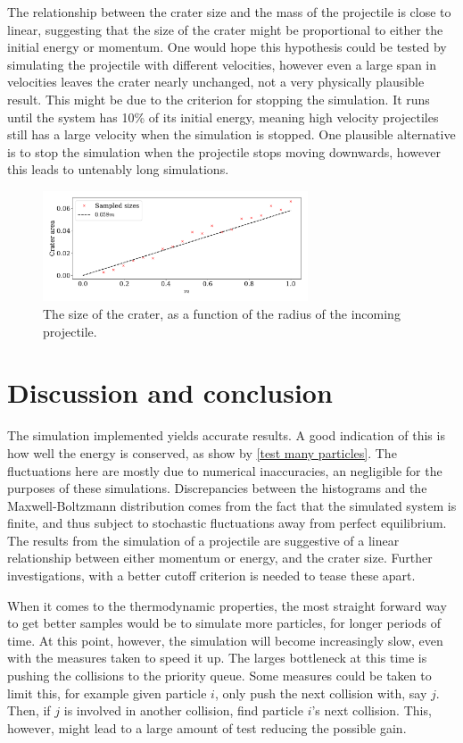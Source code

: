 \documentclass{article}
\begin{document}
    The relationship between the crater size and the mass of the projectile is close to linear, suggesting that the size of the crater might be proportional to either the initial energy or momentum.
    One would hope this hypothesis could be tested by simulating the projectile with different velocities, however even a large span in velocities leaves the crater nearly unchanged, not a very physically plausible result. 
    This might be due to the criterion for stopping the simulation.
    It runs until the system has 10\% of its initial energy, meaning high velocity projectiles still has a large velocity when the simulation is stopped. 
    One plausible alternative is to stop the simulation when the projectile stops moving downwards, however this leads to untenably long simulations.

    \begin{figure}[H]
        \centering
        \includegraphics[width=0.7\textwidth]{../plots/problem4_2/crater_size.pdf}
        \caption{The size of the crater, as a function of the radius of the incoming projectile.}
        \label{crater size}
    \end{figure}

    \section*{Discussion and conclusion}
    The simulation implemented yields accurate results.
    A good indication of this is how well the energy is conserved, as show by \autoref{test many particles}.
    The fluctuations here are mostly due to numerical inaccuracies, an negligible for the purposes of these simulations.
    Discrepancies between the histograms and the Maxwell-Boltzmann distribution comes from the fact that the simulated system is finite, and thus subject to stochastic fluctuations away from perfect equilibrium.
    The results from the simulation of a projectile are suggestive of a linear relationship between either momentum or energy, and the crater size.
    Further investigations, with a better cutoff criterion is needed to tease these apart.

    When it comes to the thermodynamic properties, the most straight forward way to get better samples would be to simulate more particles, for longer periods of time.
    At this point, however, the simulation will become increasingly slow, even with the measures taken to speed it up.
    The larges bottleneck at this time is pushing the collisions to the priority queue.
    Some measures could be taken to limit this, for example given particle $i$, only push the next collision with, say $j$.
    Then, if $j$ is involved in another collision, find particle $i$'s next collision.
    This, however, might lead to a large amount of test reducing the possible gain.
    
    \printbibliography
\end{document}
